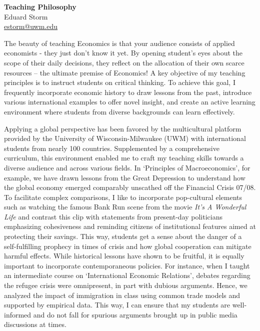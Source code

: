 \documentclass[a4paper,12pt]{article}
\begin{document}
\thispagestyle{plain}

\begin{center}
 {\Large \textbf{Teaching Philosophy}} \\
 Eduard Storm \\
 \href{mailto:estorm@uwm.edu}{estorm@uwm.edu} %
\end{center}
The beauty of teaching Economics is that your audience consists of applied economists - they just don’t know it yet. By opening student’s eyes about the scope of their daily decisions, they reflect on the allocation of their own scarce resources – the ultimate premise of Economics!  A key objective of my teaching principles is to instruct students on critical thinking. To achieve this goal, I frequently incorporate economic history to draw lessons from the past, introduce various international examples to offer novel insight, and create an active learning environment where students from diverse backgrounds can learn effectively. 

Applying a global perspective has been favored by the multicultural platform provided by the University of Wisconsin-Milwaukee (UWM) with international students from nearly 100 countries. Supplemented by a comprehensive curriculum, this environment enabled me to craft my teaching skills towards a diverse audience and across various fields. In `Principles of Macroeconomics', for example, we have drawn lessons from the Great Depression to understand how the global economy emerged comparably unscathed off the Financial Crisis 07/08. To facilitate complex comparisons, I like to incorporate pop-cultural elements such as watching the famous Bank Run scene from the movie \textit{It’s A Wonderful Life} and contrast this clip with statements from present-day politicians emphasizing cohesiveness and reminding citizens of institutional features aimed at protecting their savings. This way, students get a sense about the danger of a self-fulfilling prophecy in times of crisis and how global cooperation can mitigate harmful effects. While historical lessons have shown to be fruitful, it is equally important to incorporate contemporaneous policies. For instance, when I taught an intermediate course on `International Economic Relations', debates regarding the refugee crisis were omnipresent, in part with dubious arguments. Hence, we analyzed the impact of immigration in class using common trade models and supported by empirical data. This way, I can ensure that my students are well-informed and do not fall for spurious arguments brought up in public media discussions at times. 
\end{document}
